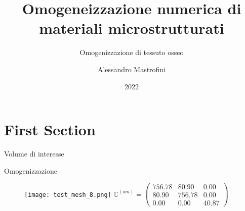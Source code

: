 \documentclass[aspectratio=169,xcolor=dvipsnames]{beamer}
\title[short title]{Omogeneizzazione numerica di materiali microstrutturati} %
\subtitle{Omogenizzazione di tessuto osseo}
\author[Pin-Yen] {Alessandro Mastrofini}
\institute[NTU] %
{
Meccanica Computazionale dei Tessuti e Biomateriali \\
Università degli Studi di Roma Tor Vergata%
}
\date{2022} %
\begin{document}
\begin{frame}
    \titlepage
\end{frame}

\section{First Section}

\begin{frame}{Volume di interesse}
    \begin{figure}%
  	\centering
  	\tiny{\def\svgwidth{\textwidth}
  	}
  \end{figure}

\end{frame}

\begin{frame}{Omogenizzazione}
	\begin{figure}
		\centering
		\begin{minipage}{0.45\linewidth}
			\begin{center}
	\texttt{[image: test\_mesh\_8.png]}
	\vspace{20pt}\vfill
	\small{$\mathbb{C}^{(o m)}=\left(\begin{array}{ccc}756.78 & 80.90 & 0.00 \\ 80.90 & 756.78 & 0.00 \\ 0.00 & 0.00 & 40.87\end{array}\right)$}
\end{center}
		\end{minipage}\hfill
		\begin{minipage}{0.51\linewidth}
		\tiny{	\def\svgwidth{\linewidth}
			}
		\end{minipage}\hfill
	\end{figure}
\end{frame}
\end{document}
